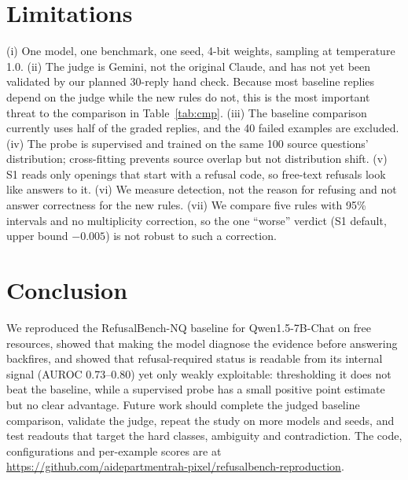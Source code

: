 \documentclass[conference]{IEEEtran}
\begin{document}
\section{Limitations}
\label{sec:limits}
(i) One model, one benchmark, one seed, 4-bit weights, sampling at temperature 1.0. (ii) The judge is Gemini, not the original Claude, and has not yet been validated by our planned 30-reply hand check. Because most baseline replies depend on the judge while the new rules do not, this is the most important threat to the comparison in Table~\ref{tab:cmp}. (iii) The baseline comparison currently uses half of the graded replies, and the 40 failed examples are excluded. (iv) The probe is supervised and trained on the same 100 source questions' distribution; cross-fitting prevents source overlap but not distribution shift. (v) S1 reads only openings that start with a refusal code, so free-text refusals look like answers to it. (vi) We measure detection, not the reason for refusing and not answer correctness for the new rules. (vii) We compare five rules with 95\% intervals and no multiplicity correction, so the one ``worse'' verdict (S1 default, upper bound $-0.005$) is not robust to such a correction.

\section{Conclusion}
We reproduced the RefusalBench-NQ baseline for Qwen1.5-7B-Chat on free resources, showed that making the model diagnose the evidence before answering backfires, and showed that refusal-required status is readable from its internal signal (AUROC 0.73--0.80) yet only weakly exploitable: thresholding it does not beat the baseline, while a supervised probe has a small positive point estimate but no clear advantage. Future work should complete the judged baseline comparison, validate the judge, repeat the study on more models and seeds, and test readouts that target the hard classes, ambiguity and contradiction. The code, configurations and per-example scores are at \url{https://github.com/aidepartmentrah-pixel/refusalbench-reproduction}.



\end{document}
